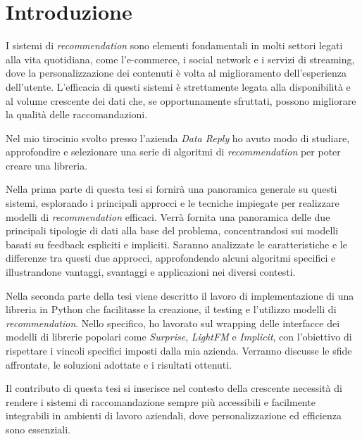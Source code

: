 \chapter{Introduzione}

I sistemi di \textit{recommendation} sono elementi fondamentali in molti settori legati alla vita quotidiana, come l'e-commerce, i social network e i servizi di streaming, dove la personalizzazione dei contenuti è volta al miglioramento dell'esperienza dell'utente. L'efficacia di questi sistemi è strettamente legata alla disponibilità e al volume crescente dei dati che, se opportunamente sfruttati, possono migliorare la qualità delle raccomandazioni. 

Nel mio tirocinio svolto presso l'azienda \textit{Data Reply} ho avuto modo di studiare, approfondire e selezionare una serie di algoritmi di \textit{recommendation} per poter creare una libreria.

Nella prima parte di questa tesi si fornirà una panoramica generale su questi sistemi, esplorando i principali approcci e le tecniche impiegate per realizzare modelli di \textit{recommendation} efficaci. Verrà fornita una panoramica delle due principali tipologie di dati alla base del problema, concentrandosi sui modelli basati su feedback espliciti e impliciti. Saranno analizzate le caratteristiche e le differenze tra questi due approcci, approfondendo alcuni algoritmi specifici e illustrandone vantaggi, svantaggi e applicazioni nei diversi contesti.

Nella seconda parte della tesi viene descritto il lavoro di implementazione di una libreria in Python che facilitasse la creazione, il testing e l'utilizzo modelli di \textit{recommendation}. Nello specifico, ho lavorato sul wrapping delle interfacce dei modelli di librerie popolari come \textit{Surprise}, \textit{LightFM} e \textit{Implicit}, con l'obiettivo di rispettare i vincoli specifici imposti dalla mia azienda. Verranno discusse le sfide affrontate, le soluzioni adottate e i risultati ottenuti.

Il contributo di questa tesi si inserisce nel contesto della crescente necessità di rendere i sistemi di raccomandazione sempre più accessibili e facilmente integrabili in ambienti di lavoro aziendali, dove personalizzazione ed efficienza sono essenziali.
